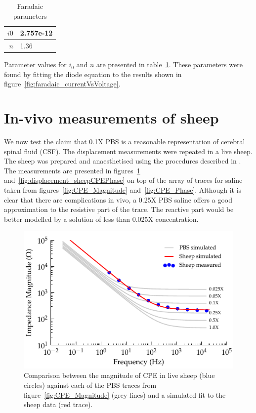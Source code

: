 \documentclass[10pt,final,journal]{IEEEtran}
\begin{document}
\begin{table}
    \begin{center}
        \begin{tabular}{|r|l|}
            \hline
            $i0$ & 2.757e-12\\ \hline
            $n$ & 1.36\\ \hline
        \end{tabular}
    \end{center}
    \caption{Faradaic parameters}
    \label{tab:FaradaicParams}
\end{table}

Parameter values for $i_{0}$ and $n$ are presented in table~\ref{tab:FaradaicParams}. These parameters were found by fitting the diode equation to the results shown in figure~\ref{fig:faradaic_currentVsVoltage}. 

\section{In-vivo measurements of sheep}

We now test the claim that 0.1X PBS is a reasonable representation of cerebral spinal fluid (CSF).
The displacement measurements were repeated in a live sheep. The sheep was prepared and anaesthetised using the procedures described in \cite{Parker2013}. The measurements are presented in figures~\ref{fig:displacement_sheepCPEMagnitude} and~\ref{fig:displacement_sheepCPEPhase} on top of the array of traces for saline taken from figures~\ref{fig:CPE_Magnitude}
and~\ref{fig:CPE_Phase}. 
Although it is clear that there are complications in vivo, a 0.25X PBS saline offers a good approximation to the resistive part of the trace.
The reactive part would be better modelled by a solution of less than 0.025X concentration.


\begin{figure}
    \begin{center}
        \includegraphics{graphics/displacement-withSheep_impedanceVsFrequency_magnitude}
    \end{center}
    \caption{Comparison between the magnitude of CPE in live sheep (blue circles) against each of the PBS traces from figure~\ref{fig:CPE_Magnitude} (grey lines) and a simulated fit to the sheep data (red trace).}
    \label{fig:displacement_sheepCPEMagnitude}
\end{figure}
\end{document}
